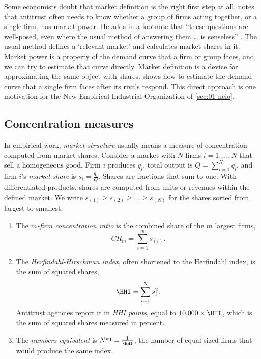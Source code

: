 Some economists doubt that market definition is the right first step at all. \citet[p.~1049]{Bresnahan1989}
notes that antitrust often needs to know whether a group of firms acting together, or a single firm, has market
power. He adds in a footnote that ``these questions are well-posed, even where the usual method of answering
them \ldots{} is senseless'' \citep[p.~1049, n.~44]{Bresnahan1989}. The usual method defines a `relevant
market' and calculates market shares in it. Market power is a property of the demand curve that a firm or group
faces, and we can try to estimate that curve directly. Market definition is a device for approximating the same
object with shares.  shows how to estimate the demand curve that a single firm faces after its
rivals respond. This
direct approach is one motivation for the New Empirical Industrial Organization of \cref{sec:01-neio}.

\subsection{Concentration measures}\label{sec:01-concentration}

In empirical work, \emph{market structure} usually means a measure of concentration computed from market
shares. Consider a market with $N$ firms $i = 1, \dots, N$ that sell a homogeneous good. Firm $i$ produces
$q_i$, total output is $Q = \sum_{i=1}^{N} q_i$, and firm $i$'s \emph{market share} is $s_i = \frac{q_i}{Q}$.
Shares are fractions that sum to one. With differentiated products, shares are computed from units or revenues
within the defined market. We write $s_{(1)} \ge s_{(2)} \ge \dots \ge s_{(N)}$ for the shares sorted from
largest to smallest.

\begin{definition}\label{def:01-concentration}
\leavevmode
\begin{enumerate}[label=(\roman*)]
  \item The \emph{$m$-firm concentration ratio} is the combined share of the $m$ largest firms,
  \[
    \mathit{CR}_m = \sum_{i=1}^{m} s_{(i)} .
  \]
  \item The \emph{Herfindahl-Hirschman index}, often shortened to the Herfindahl index, is the sum of squared
  shares,
  \begin{equation}\label{eq:01-hhi}
    \HHI = \sum_{i=1}^{N} s_i^2 .
  \end{equation}
  Antitrust agencies report it in \emph{HHI points}, equal to $10{,}000 \times \HHI$, which is the sum of
  squared shares measured in percent.
  \item The \emph{numbers equivalent} is $N^{\mathrm{eq}} = \frac{1}{\HHI}$, the number of equal-sized firms that would
  produce the same index.
\end{enumerate}
\end{definition}

